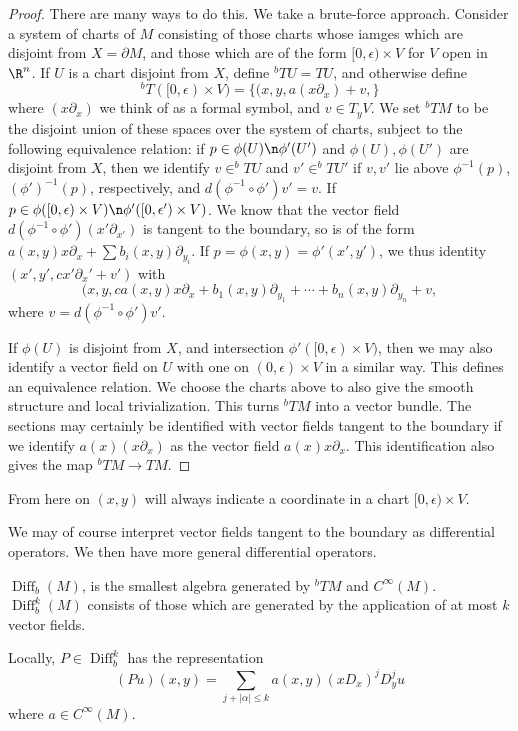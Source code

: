 \documentclass[12pt]{article}
\DeclareMathOperator{\Diff}{Diff}
\begin{document}
\begin{proof}
There are many ways to do this. We take a brute-force approach. Consider a system of charts of $M$ consisting of those charts whose iamges which are disjoint from $X= \partial M$, and those which are of the form $[0,\epsilon)\times V$ for $V$ open in $\R^n$. If $U$ is a chart disjoint from $X$, define $^bTU = TU$, and otherwise define
\[^bT([0,\epsilon)\times V) = \{(x,y,a(x\partial_x) + v,\}\]
where $(x\partial_x)$ we think of as a formal symbol, and $v \in T_yV$. We set $^bTM$ to be the disjoint union of these spaces over the system of charts, subject to the following equivalence relation: if $p \in \phi(U)\n \phi'(U')$ and $\phi(U),\phi(U')$ are disjoint from $X$, then we identify $v \in ^bTU$ and $v' \in ^bTU'$ if $v,v'$ lie above $\phi^{-1}(p)$, $(\phi')^{-1}(p)$, respectively, and $d(\phi^{-1}\circ \phi')v' = v$. If $p \in \phi([0,\epsilon)\times V)\n\phi'([0,\epsilon')\times V)$. We know that the vector field $d(\phi^{-1}\circ \phi')(x'\partial_{x'})$ is tangent to the boundary, so is of the form $a(x,y)x\partial_x + \sum b_i(x,y)\partial_{y_i}$. If $p = \phi(x,y) = \phi'(x',y')$, we thus identity $(x',y',cx'\partial_x' + v')$ with \[(x,y,ca(x,y)x\partial_x + b_1(x,y)\partial_{y_1} + \cdots + b_n(x,y)\partial_{y_n} + v,\]
where $v = d(\phi^{-1}\circ \phi')v'$.

If $\phi(U)$ is disjoint from $X$, and intersection $\phi'([0,\epsilon)\times V)$, then we may also identify a vector field on $U$ with one on $(0,\epsilon)\times V$ in a similar way. This defines an equivalence relation. We choose the charts above to also give the smooth structure and local trivialization. This turns $^bTM$ into a vector bundle. The sections may certainly be identified with vector fields tangent to the boundary if we identify $a(x)(x\partial_x)$ as the vector field $a(x)x\partial_x$. This identification also gives the map $^bTM \to TM$.\end{proof}

From here on $(x,y)$ will always indicate a coordinate in a chart $[0,\epsilon)\times V$.

We may of course interpret vector fields tangent to the boundary as differential operators.
We then have more general differential operators.
\begin{def}$\Diff_b(M)$, is the smallest algebra generated by $^bTM$ and $C^\infty(M)$. $\Diff^k_b(M)$ consists of those which are generated by the application of at most $k$ vector fields.\end{def}
Locally, $P \in \Diff_b^k$ has the representation 
\[(Pu)(x,y) = \sum_{j+|\alpha| \leq k} a(x,y)(xD_x)^jD_y^{j}u\]
where $a \in C^\infty(M)$.
\end{document}
